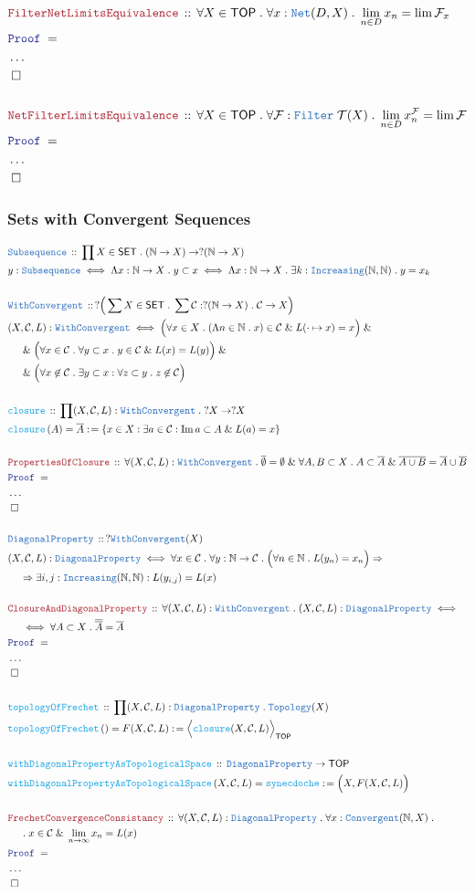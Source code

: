 \documentclass[12pt]{scrartcl}
\newcommand{\TYPE}[1]{\textcolor{NavyBlue}{\mathtt{#1}}}
\newcommand{\FUNC}[1]{\textcolor{Cerulean}{\mathtt{#1}}}
\newcommand{\LOGIC}[1]{\textcolor{Blue}{\mathtt{#1}}}
\newcommand{\THM}[1]{\textcolor{Maroon}{\mathtt{#1}}}
\renewcommand{\.}{\; . \;}
\newcommand{\de}{: \kern 0.1pc =}
\newcommand{\Act}[1]{\left( #1 \right)}
\newcommand{\Theorem}[2]{& \THM{#1} \, :: \, #2 \\ & \Proof = \\ }
\newcommand{\DeclareType}[2]{& \TYPE{#1} \, :: \, #2 \\}
\newcommand{\DefineType}[3]{& #1 : \TYPE{#2} \iff #3 \\}
\newcommand{\DefineNamedType}[4]{& #1 : \TYPE{#2} \iff #3 \iff #4 \\}
\newcommand{\DeclareFunc}[2]{& \FUNC{#1} \, :: \, #2 \\}
\newcommand{\DefineNamedFunc}[4]{&  \FUNC{#1}\Act{#2} = #3 \de #4 \\}
\newcommand{\NewLine}{\\ & \kern 1pc}
\newcommand{\Page}[1]{ \begin{align*} #1 \end{align*}   }
\newcommand{\NoProof}{ & \ldots \\ \EndProof}
\renewcommand{\And}{\; \& \;}
\newcommand{\Imply}{\Rightarrow}
\newcommand{\Nat}{\mathbb{N} }
\DeclareMathOperator*{\im}{Im}
\newcommand{\QED}{\; \square}
\newcommand{\EndProof}{& \QED \\}
\newcommand{\Proof}{\LOGIC{Proof} \; }
\newcommand{\C}{\mathcal{C}}
\newcommand{\SET}{\mathsf{SET}}
\newcommand{\TOP}{\mathsf{TOP}}
\newcommand{\T}{\mathcal{T}}
\newcommand{\F}{\mathcal{F}}
\begin{document}
\newpage
\Page{
	\Theorem{FilterNetLimitsEquivalence}
	{
		\forall X \in \TOP \. 
		\forall x : \TYPE{Net}(D,X) \.
		\lim_{n \in D} x_n = \lim \F_x
	}
	\NoProof
	\\
	\Theorem{NetFilterLimitsEquivalence}
	{
		\forall X \in \TOP \. 
		\forall \F : \TYPE{Filter}\; \T(X) \.
		\lim_{n \in D} x_n^\F  = \lim \F
	}
	\NoProof
}
\newpage
\subsubsection{Sets with Convergent Sequences}
\Page{
	\DeclareType{Subsequence}{\prod X \in \SET \. (\Nat \to X) \to ?(\Nat \to X)}
	\DefineNamedType{y}{Subsequence}{\Lambda x : \Nat \to X \. y \subset x}
	{
		\Lambda x : \Nat \to X \. \exists k : \TYPE{Increasing}(\Nat,\Nat) \. y = x_k
	}
	\\
	\DeclareType{WithConvergent}
	{
		?\Big( \sum X \in \SET \. \sum \C : ?(\Nat \to X) \. \C \to X  \Big)
	}
	\DefineType{(X,\C,L)}
	{
		\TYPE{WithConvergent}
	}
	{
		\Big( \forall x \in X \. 
		(\Lambda n \in \Nat \. x) \in \C \And  L(\cdot \mapsto x) = x \Big) \And \NewLine \And
		\Big( 
			\forall x \in \C \. \forall y \subset x \. y \in \C \And L(x) = L(y)
		\Big) \And \NewLine \And
		\Big(
			\forall x \not \in \C \. \exists y \subset x : \forall z \subset y \. z \not \in \C
		\Big)
	}
	\\
	\DeclareFunc{closure}{\prod (X,\C,L) : \TYPE{WithConvergent} \. ?X \to ?X}
	\DefineNamedFunc{closure}{A}{\overline{A}}{\{ x \in X : \exists a \in \C : \im a \subset A \And L(a) = x \}}
	\\
	\Theorem{PropertiesOfClosure}
	{
		\forall (X,\C,L) : \TYPE{WithConvergent} \.
		\overline{\emptyset} = \emptyset \And
		\forall A,B \subset X \. 
		A \subset \overline{A} \And
		\overline{A \cup B} = \overline{A} \cup \overline{B}
	}
	\NoProof
	\\
	\DeclareType{DiagonalProperty}
	{
		? \TYPE{WithConvergent}(X)
	}
	\DefineType{(X,\C,L)}{DiagonalProperty}
	{
		\forall x \in \C \. 
		\forall y : \Nat \to \C \.
		\Big( \forall n \in \Nat \. L(y_n) = x_n  \Big) \Imply \NewLine \Imply 
		\exists i,j : \TYPE{Increasing}(\Nat,\Nat) : 
		L( y_{i,j} ) = L(x)
	}
	\\
	\Theorem{ClosureAndDiagonalProperty}
	{
		\forall (X,\C,L) : \TYPE{WithConvergent} \. 
		(X,\C,L) : \TYPE{DiagonalProperty} \iff \NewLine \iff
		\forall A \subset X \. \overline{\overline{A}} = \overline{A}
	}
	\NoProof
	\\
	\DeclareFunc{topologyOfFrechet}
	{
		\prod (X,\C,L) : \TYPE{DiagonalProperty} \.
		\TYPE{Topology}(X)
	}
	\DefineNamedFunc{topologyOfFrechet}{}{F(X,\C,L)}{ \Big\langle \FUNC{closure}(X,\C,L)  \Big\rangle_\TOP}
	\\
	\DeclareFunc{withDiagonalPropertyAsTopologicalSpace}{ \TYPE{DiagonalProperty} \to \TOP  }
	\DefineNamedFunc{withDiagonalPropertyAsTopologicalSpace}{X,\C,L}
	{ \FUNC{synecdoche} }{ \Big( X, F(X,\C,L) \Big)  }
	\\
	\Theorem{FrechetConvergenceConsistancy}
	{
		\forall (X,\C,L) : \TYPE{DiagonalProperty} \. 
		\forall x : \TYPE{Convergent}(\Nat,X) \. \NewLine \.  
		x \in \C \And \lim_{n \to \infty} x_n = L(x)
	}
	\NoProof
}
\newpage
\end{document}
